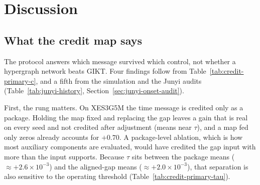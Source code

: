 \documentclass[review,12pt]{elsarticle}
\begin{document}




\section{Discussion}
\label{sec:discussion}

\subsection{What the credit map says}
\label{sec:auc-tradeoff}
The protocol answers which message survived which control, not whether
a hypergraph network beats GIKT. Four findings follow from
Table~\ref{tab:credit-primary-c}, and a fifth from the simulation and
the Junyi audits (Table~\ref{tab:junyi-history},
Section~\ref{sec:junyi-onset-audit}).

First, the rung matters. On XES3G5M the time message is credited only
as a package. Holding the map fixed and replacing the gap leaves a gain
that is real on every seed and not credited after adjustment (means
near $\tau$), and a map fed only zeros already accounts for $+0.70$. A
package-level ablation, which is how most auxiliary components are
evaluated, would have credited the gap input with more than the input
supports. Because $\tau$ sits between the package means
($\approx{+}2.6\times 10^{-3}$) and the aligned-gap means
($\approx{+}2.0\times 10^{-3}$), that separation is also sensitive to the
operating threshold (Table~\ref{tab:credit-primary-tau}).
\end{document}
